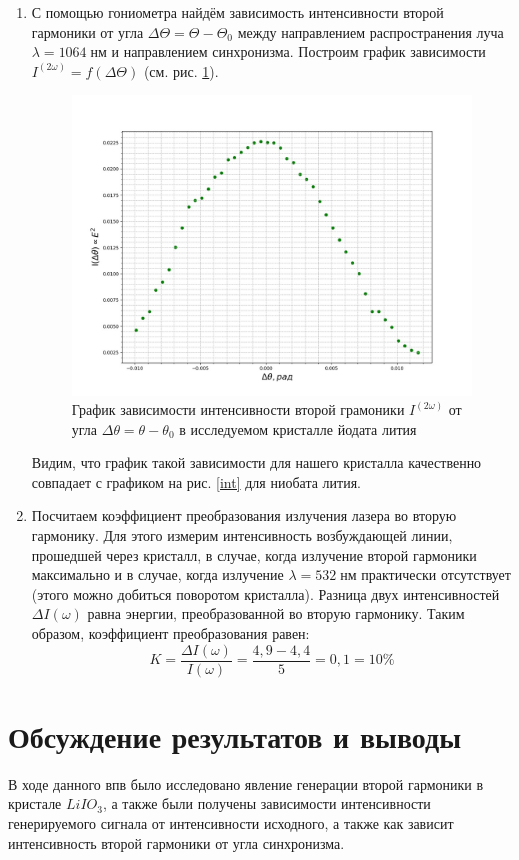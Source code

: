 \documentclass[a4paper,12pt]{article} %
\begin{document}
\begin{enumerate}
\item С помощью гониометра найдём зависимость интенсивности второй гармоники от угла $\Delta \Theta = \Theta - \Theta_0$ между направлением распространения луча $\lambda = 1064 \; нм$ и направлением синхронизма. Построим график зависимости $I^{(2 \omega)} = f(\Delta \Theta)$ (см. рис. \ref{I_Dtheta}).


\begin{figure}[H]
	\includegraphics[scale=0.5]{4.jpg}
	\caption{График зависимости интенсивности второй грамоники $I^{(2 \omega)}$ от угла $\Delta \theta = \theta - \theta_0$ в исследуемом кристалле йодата лития}
	\label{I_Dtheta}
\end{figure}

Видим, что график такой зависимости для нашего кристалла качественно совпадает с графиком на рис. \ref{int} для ниобата лития.

\item Посчитаем коэффициент преобразования излучения лазера во вторую гармонику. Для этого измерим интенсивность возбуждающей линии, прошедшей через кристалл, в случае, когда излучение второй гармоники максимально и в случае, когда излучение $\lambda = 532 \; нм$ практически отсутствует (этого можно добиться поворотом кристалла). Разница двух интенсивностей $\Delta I(\omega)$ равна энергии, преобразованной во вторую гармонику. Таким образом, коэффициент преобразования равен:
$$K = \frac{\Delta I(\omega)}{I(\omega)} = \frac{4,9 - 4,4}{5} = 0,1 = 10 \%$$

\end{enumerate}

\section{Обсуждение результатов и выводы}
В ходе данного впв было исследовано явление генерации второй гармоники в кристале $LiIO_3$, а также были получены зависимости интенсивности генерируемого сигнала от интенсивности исходного, а также как зависит интенсивность второй гармоники от угла синхронизма.
\end{document}
